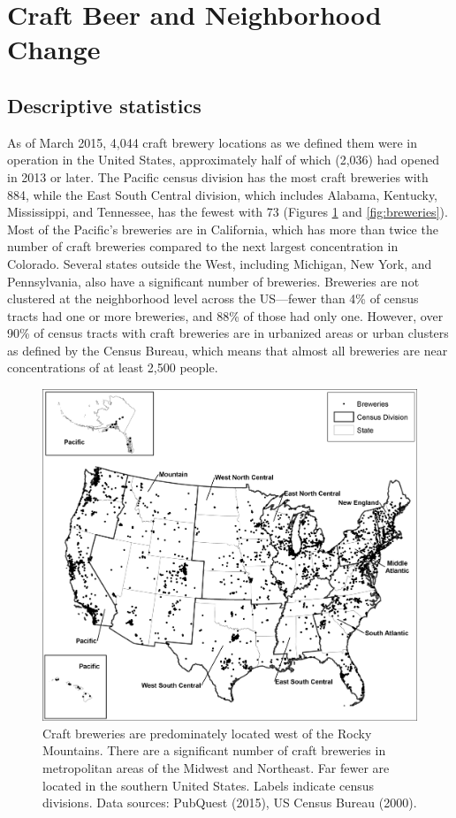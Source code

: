 \documentclass[]{article}
\begin{document}
\section{Craft Beer and Neighborhood
Change}\label{craft-beer-and-neighborhood-change}

\subsection{Descriptive statistics}\label{descriptive-statistics}

As of March 2015, 4,044 craft brewery locations as we defined them were
in operation in the United States, approximately half of which (2,036)
had opened in 2013 or later. The Pacific census division has the most
craft breweries with 884, while the East South Central division, which
includes Alabama, Kentucky, Mississippi, and Tennessee, has the fewest
with 73 (Figures \ref{fig:usa} and \ref{fig:breweries}). Most of the Pacific's breweries are in
California, which has more than twice the number of craft breweries
compared to the next largest concentration in Colorado. Several states
outside the West, including Michigan, New York, and Pennsylvania, also
have a significant number of breweries. Breweries are not clustered at
the neighborhood level across the US---fewer than 4\% of census tracts
had one or more breweries, and 88\% of those had only one. However, over
90\% of census tracts with craft breweries are in urbanized areas or
urban clusters as defined by the Census Bureau, which means that almost
all breweries are near concentrations of at least 2,500 people.

\begin{figure}
	\centering
		\includegraphics[width=0.95\linewidth]{fig01.png}
	\caption{Craft breweries are predominately located west of the Rocky
Mountains. There are a significant number of craft breweries in
metropolitan areas of the Midwest and Northeast. Far fewer are located
in the southern United States. Labels indicate census divisions. Data
sources: PubQuest (2015), US Census Bureau (2000).}
	\label{fig:usa}
\end{figure} 
\end{document}
